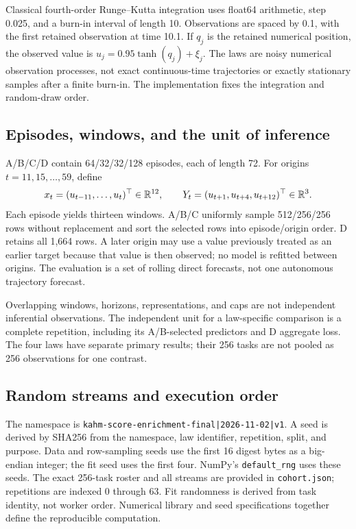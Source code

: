 Classical fourth-order Runge--Kutta integration uses float64 arithmetic, step 0.025, and a burn-in interval of length 10. Observations are spaced by 0.1, with the first retained observation at time 10.1. If $q_j$ is the retained numerical position, the observed value is $u_j=0.95\tanh(q_j)+\xi_j$. The laws are noisy numerical observation processes, not exact continuous-time trajectories or exactly stationary samples after a finite burn-in. The implementation fixes the integration and random-draw order.

\subsection{Episodes, windows, and the unit of inference}
A/B/C/D contain 64/32/32/128 episodes, each of length 72. For origins $t=11,15,\ldots,59$, define
\[
 x_t=(u_{t-11},\ldots,u_t)^\top\in\mathbb R^{12},\qquad
 Y_t=(u_{t+1},u_{t+4},u_{t+12})^\top\in\mathbb R^3.
\]
Each episode yields thirteen windows. A/B/C uniformly sample 512/256/256 rows without replacement and sort the selected rows into episode/origin order. D retains all 1,664 rows. A later origin may use a value previously treated as an earlier target because that value is then observed; no model is refitted between origins. The evaluation is a set of rolling direct forecasts, not one autonomous trajectory forecast.

Overlapping windows, horizons, representations, and caps are not independent inferential observations. The independent unit for a law-specific comparison is a complete repetition, including its A/B-selected predictors and D aggregate loss. The four laws have separate primary results; their 256 tasks are not pooled as 256 observations for one contrast.

\subsection{Random streams and execution order}
The namespace is \texttt{kahm-score-enrichment-final|2026-11-02|v1}. A seed is derived by SHA256 from the namespace, law identifier, repetition, split, and purpose. Data and row-sampling seeds use the first 16 digest bytes as a big-endian integer; the fit seed uses the first four. NumPy's \texttt{default\_rng} uses these seeds. The exact 256-task roster and all streams are provided in \texttt{cohort.json}; repetitions are indexed 0 through 63. Fit randomness is derived from task identity, not worker order. Numerical library and seed specifications together define the reproducible computation.

